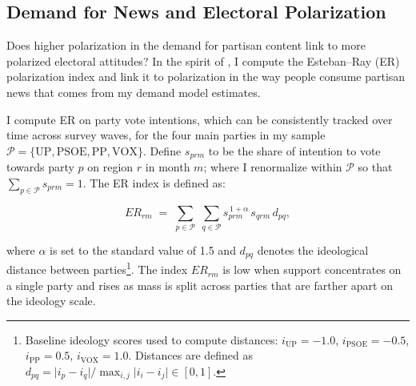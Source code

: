 \documentclass[12pt]{article}
\begin{document}

	\subsection{Demand for News and Electoral Polarization}
	
	
	

Does higher polarization in the demand for partisan content link to more polarized electoral attitudes? In the spirit of \cite{martin2017}, I 
compute the Esteban–Ray (ER) polarization index and link it to polarization in the way people consume partisan news that comes from my demand model estimates. 

I compute ER on party vote intentions, which can be consistently tracked over time across survey waves,  for the four main parties in my sample $\mathcal{P}=\{\mathrm{UP},\mathrm{PSOE},\mathrm{PP},\mathrm{VOX}\}$. Define $s_{prm}$ to be the share of intention to vote towards party $p$ on region $r$ in month $m$; where I renormalize within $\mathcal{P}$ so that $\sum_{p\in\mathcal{P}} s_{prm}=1$. The ER index is defined as: 

\begin{equation}
	ER_{rm} \;=\; 
	\displaystyle\sum_{p\in\mathcal{P}} \; \sum_{q\in\mathcal{P}} 
	s_{prm}^{\,1+\alpha}\, s_{qrm}\, d_{pq},
		\label{eq:er}
\end{equation}


where $\alpha$ is set to the standard value of 1.5 and $d_{pq}$ denotes the  ideological distance between parties\footnote{Baseline ideology scores used to compute distances: $i_{\mathrm{UP}}=-1.0$, $i_{\mathrm{PSOE}}=-0.5$, $i_{\mathrm{PP}}=0.5$, $i_{\mathrm{VOX}}=1.0$. Distances are defined as $d_{pq}=\lvert i_p-i_q\rvert/\max_{i,j}\lvert i_i-i_j\rvert \in [0,1]$.}. The index $ER_{rm}$ is low when support concentrates on a single party and rises as mass is split across parties that are farther apart on the ideology scale.
\end{document}
